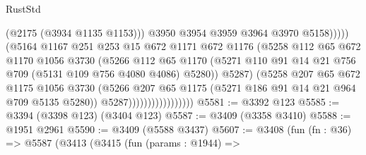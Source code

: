 \begin{lexlean}{RustStd}
\begin{coremodule}
                                              (@2175 (@3934 @1135 @1153)))
                                            @3950
                                            @3954
                                            @3959
                                            @3964
                                            @3970
                                            @5158)))))
                                  (@5164
                                    @1167
                                    @251
                                    @253
                                    @15
                                    @672
                                    @1171
                                    @672
                                    @1176
                                    (@5258
                                      @112
                                      @65
                                      @672
                                      @1170
                                      @1056
                                      @3730
                                      (@5266
                                        @112
                                        @65
                                        @1170
                                        (@5271
                                          @110
                                          @91
                                          @14
                                          @21
                                          @756
                                          @709
                                          (@5131 @109 @756 @4080 @4086)
                                          @5280))
                                      @5287)
                                    (@5258
                                      @207
                                      @65
                                      @672
                                      @1175
                                      @1056
                                      @3730
                                      (@5266
                                        @207
                                        @65
                                        @1175
                                        (@5271 @186 @91 @14 @21 @964 @709 @5135 @5280))
                                      @5287)))))))))))))))))
@5581 := @3392 @123
@5585 := @3394 (@3398 @123) (@3404 @123)
@5587 := @3409 (@3358 @3410)
@5588 := @1951 @2961
@5590 := @3409 (@5588 @3437)
@5607 := @3408
    (fun (fn : @36) =>
    @5587
      (@3413
        (@3415
          (fun (params : @1944) =>

\end{coremodule}
\end{lexlean}
